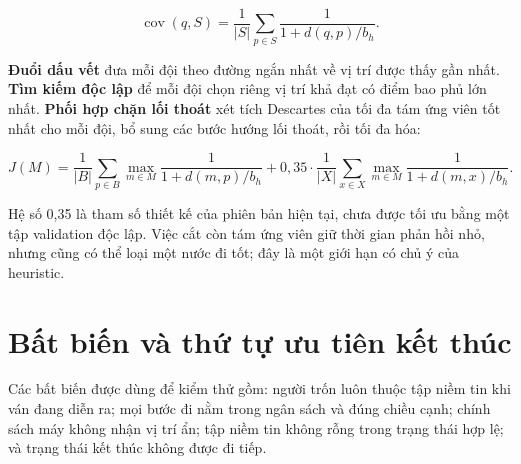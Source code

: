 \begin{formulabox}[title={Điểm bao phủ nghịch đảo khoảng cách}]
\[
  \operatorname{cov}(q,S)=\frac{1}{|S|}\sum_{p\in S}
  \frac{1}{1+d(q,p)/b_h}.
\]
\end{formulabox}

\textbf{Đuổi dấu vết} đưa mỗi đội theo đường ngắn nhất về vị trí được thấy gần
nhất. \textbf{Tìm kiếm độc lập} để mỗi đội chọn riêng vị trí khả đạt có điểm
bao phủ lớn nhất. \textbf{Phối hợp chặn lối thoát} xét tích Descartes của tối đa
tám ứng viên tốt nhất cho mỗi đội, bổ sung các bước hướng lối thoát, rồi tối đa
hóa:

\begin{formulabox}[title={Điểm phối hợp}]
\[
J(M)=\frac{1}{|B|}\sum_{p\in B}\max_{m\in M}
\frac{1}{1+d(m,p)/b_h}
+0{,}35\cdot\frac{1}{|X|}\sum_{x\in X}\max_{m\in M}
\frac{1}{1+d(m,x)/b_h}.
\]
\end{formulabox}

Hệ số 0,35 là tham số thiết kế của phiên bản hiện tại, chưa được tối ưu bằng một
tập validation độc lập. Việc cắt còn tám ứng viên giữ thời gian phản hồi nhỏ,
nhưng cũng có thể loại một nước đi tốt; đây là một giới hạn có chủ ý của heuristic.

\section{Bất biến và thứ tự ưu tiên kết thúc}

Các bất biến được dùng để kiểm thử gồm: người trốn luôn thuộc tập niềm tin khi
ván đang diễn ra; mọi bước đi nằm trong ngân sách và đúng chiều cạnh; chính sách
máy không nhận vị trí ẩn; tập niềm tin không rỗng trong trạng thái hợp lệ; và
trạng thái kết thúc không được đi tiếp.

